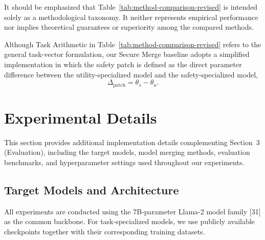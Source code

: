 It should be emphasized that Table~\ref{tab:method-comparison-revised} is intended solely as a methodological taxonomy. It neither represents empirical performance nor implies theoretical guarantees or superiority among the compared methods.

Although Task Arithmetic in Table~\ref{tab:method-comparison-revised} refers to the general task-vector formulation, our Secure Merge baseline adopts a simplified implementation in which the safety patch is defined as the direct parameter difference between the utility-specialized model and the safety-specialized model,
\[
\Delta_{\mathrm{patch}}=\theta_s-\theta_u.
\]




\section{Experimental Details}
\label{app:実験設計の詳細}

This section provides additional implementation details complementing Section~3 (Evaluation), including the target models, model merging methods, evaluation benchmarks, and hyperparameter settings used throughout our experiments.


\subsection{Target Models and Architecture}

All experiments are conducted using the 7B-parameter Llama-2 model family [31] as the common backbone. For task-specialized models, we use publicly available checkpoints together with their corresponding training datasets.


